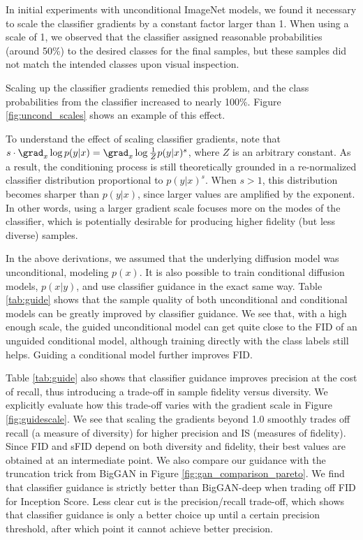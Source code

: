 In initial experiments with unconditional ImageNet models, we found it necessary to scale the classifier gradients by a constant factor larger than 1. When using a scale of 1, we observed that the classifier assigned reasonable probabilities (around 50\%) to the desired classes for the final samples, but these samples did not match the intended classes upon visual inspection.

Scaling up the classifier gradients remedied this problem, and the class probabilities from the classifier increased to nearly 100\%. Figure \ref{fig:uncond_scales} shows an example of this effect.

To understand the effect of scaling classifier gradients, note that $s \cdot \grad_x \log p(y|x) = \grad_x \log \frac{1}{Z} p(y|x)^s$, where $Z$ is an arbitrary constant. As a result, the conditioning process is still theoretically grounded in a re-normalized classifier distribution proportional to $p(y|x)^s$. When $s > 1$, this distribution becomes sharper than $p(y|x)$, since larger values are amplified by the exponent. In other words, using a larger gradient scale focuses more on the modes of the classifier, which is potentially desirable for producing higher fidelity (but less diverse) samples.

In the above derivations, we assumed that the underlying diffusion model was unconditional, modeling $p(x)$. It is also possible to train conditional diffusion models, $p(x|y)$, and use classifier guidance in the exact same way. Table \ref{tab:guide} shows that the sample quality of both unconditional and conditional models can be greatly improved by classifier guidance. We see that, with a high enough scale, the guided unconditional model can get quite close to the FID of an unguided conditional model, although training directly with the class labels still helps. Guiding a conditional model further improves FID. 

Table \ref{tab:guide} also shows that classifier guidance improves precision at the cost of recall, thus introducing a trade-off in sample fidelity versus diversity. We explicitly evaluate how this trade-off varies with the gradient scale in Figure \ref{fig:guidescale}. We see that scaling the gradients beyond 1.0 smoothly trades off recall (a measure of diversity) for higher precision and IS (measures of fidelity). Since FID and sFID depend on both diversity and fidelity, their best values are obtained at an intermediate point. We also compare our guidance with the truncation trick from BigGAN in Figure \ref{fig:gan_comparison_pareto}. We find that classifier guidance is strictly better than BigGAN-deep when trading off FID for Inception Score. Less clear cut is the precision/recall trade-off, which shows that classifier guidance is only a better choice up until a certain precision threshold, after which point it cannot achieve better precision.

